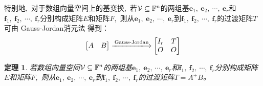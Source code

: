 \documentclass[10pt, a4paper, oneside, fontset=none]{ctexart}
\theoremstyle{plain}
\newtheorem{theorem}{定理}[section]
\theoremstyle{definition}
\newcommand{\com}{,\,\,\,\:}
\begin{document}
特别地\com 对于数组向量空间上的基变换\com 若$\mathcal{V} \subseteq \mathbb{F}^n$的两组基$\boldsymbol{e}_1,~\boldsymbol{e}_2,~\cdots,~\boldsymbol{e}_r$和$\boldsymbol{f}_1,~\boldsymbol{f}_2,~\cdots,~\boldsymbol{f}_r$分别构成矩阵$E$和矩阵$F$\com 则从$\boldsymbol{e}_1,~\boldsymbol{e}_2,~\cdots,~\boldsymbol{e}_r$到$\boldsymbol{f}_1,~\boldsymbol{f}_2,~\cdots,~\boldsymbol{f}_r$的过渡矩阵$T$可由 Gauss-Jordan消元法 得到：
$$\begin{bmatrix}
    A & B
\end{bmatrix}\xlongrightarrow{\text{Gauss-Jordan}}\begin{bmatrix}
    I_r & T \\ O & O
\end{bmatrix}$$
\begin{theorem}
    若数组向量空间$\mathcal{V} \subseteq \mathbb{F}^n$的两组基$\boldsymbol{e}_1,~\boldsymbol{e}_2,~\cdots,~\boldsymbol{e}_r$和$\boldsymbol{f}_1,~\boldsymbol{f}_2,~\cdots,~\boldsymbol{f}_r$分别构成矩阵$E$和矩阵$F$\com 则从$\boldsymbol{e}_1,~\boldsymbol{e}_2,~\cdots,~\boldsymbol{e}_r$到$\boldsymbol{f}_1,~\boldsymbol{f}_2,~\cdots,~\boldsymbol{f}_r$的过渡矩阵$T=A^+B$。
\end{theorem}
\end{document}

